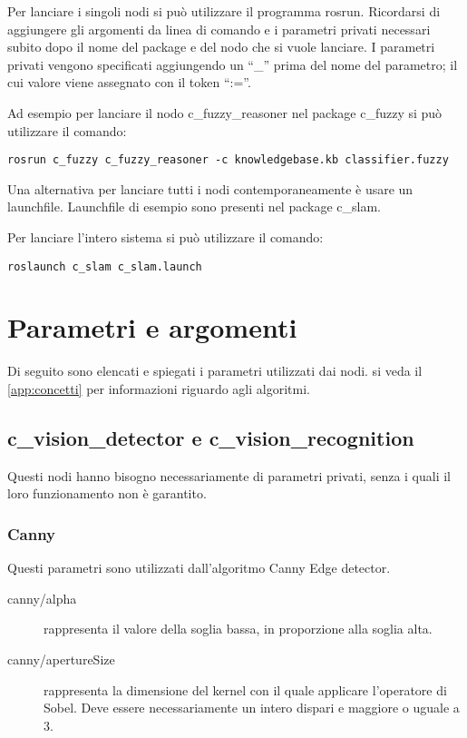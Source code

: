 Per lanciare i singoli nodi si può utilizzare il programma rosrun. Ricordarsi di aggiungere gli argomenti da linea di comando e i parametri privati necessari subito dopo il nome del package e del nodo che si vuole lanciare. 
I parametri privati vengono specificati aggiungendo un ``\_'' prima del nome del parametro; il cui valore viene assegnato con il token ``:=''.

Ad esempio per lanciare il nodo c\_fuzzy\_reasoner nel package c\_fuzzy si può utilizzare il comando:

\begin{verbatim}
rosrun c_fuzzy c_fuzzy_reasoner -c knowledgebase.kb classifier.fuzzy
\end{verbatim}

Una alternativa per lanciare tutti i nodi contemporaneamente è usare un launchfile. Launchfile di esempio sono presenti nel package c\_slam.

Per lanciare l'intero sistema si può utilizzare il comando:

\begin{verbatim}
roslaunch c_slam c_slam.launch
\end{verbatim}


\section{Parametri e argomenti}

Di seguito sono elencati e spiegati i parametri utilizzati dai nodi. si veda il \autoref{app:concetti} per informazioni riguardo agli algoritmi.

\subsection{c\_vision\_detector e c\_vision\_recognition}

Questi nodi hanno bisogno necessariamente di parametri privati, senza i quali il loro funzionamento non è garantito.

\subsubsection{Canny}

Questi parametri sono utilizzati dall'algoritmo Canny Edge detector.

\begin{description}
 \item [canny/alpha] rappresenta il valore della soglia bassa, in proporzione alla soglia alta.
 \item [canny/apertureSize] rappresenta la dimensione del kernel con il quale applicare l'operatore di Sobel. Deve essere necessariamente un intero dispari e maggiore o uguale a 3. 
\end{description}

